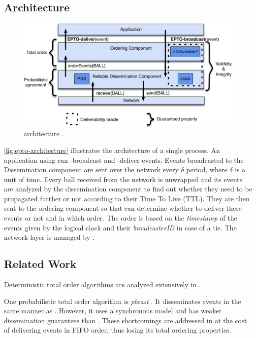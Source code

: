 \subsection{\epto Architecture}
\begin{figure}[htp]
	\includegraphics[width=\linewidth]{figures/architecture.pdf}
	\caption{\epto architecture \autocite{matos2015epto}.}
	\label{fig:epto-architecture}
\end{figure}
\autoref{fig:epto-architecture} illustrates the architecture of a single \epto process. An application using \epto can \epto-broadcast and \epto-deliver events. Events broadcasted to the Dissemination component are sent over the network every $\delta$ period, where $\delta$ is a unit of time. Every ball received from the network is unwrapped and its events are analyzed by the dissemination component to find out whether they need to be propagated further or not according to their Time To Live (TTL). They are then sent to the ordering component so that \epto can determine whether to deliver these events or not and in which order. The order is based on the \textit{timestamp} of the events given by the logical clock and their \textit{broadcasterID} in case of a tie. The network layer is managed by \sys.
\subsection{Related Work}
Deterministic total order algorithms are analyzed extensively in \autocite{defago2004total}.

One probabilistic total order algorithm is \textit{pbcast} \autocite{pbcast1996}. It disseminates events in the same manner as \epto. However, it uses a synchronous model and has weaker dissemination guarantees than \epto. These shortcomings are addressed in \autocite{birman1999bimodal} at the cost of delivering events in FIFO order, thus losing its total ordering properties.

